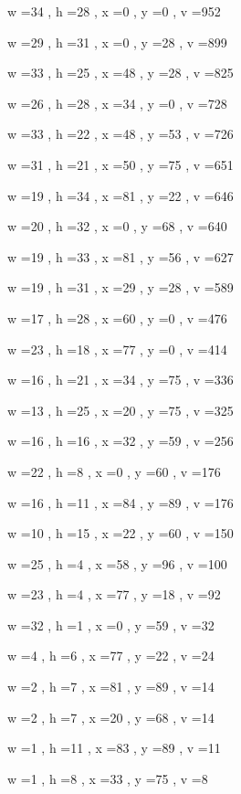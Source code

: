 \documentclass[11pt]{article}
\begin{document}
w =34 , h =28 , x =0 , y =0 , v =952
\par
w =29 , h =31 , x =0 , y =28 , v =899
\par
w =33 , h =25 , x =48 , y =28 , v =825
\par
w =26 , h =28 , x =34 , y =0 , v =728
\par
w =33 , h =22 , x =48 , y =53 , v =726
\par
w =31 , h =21 , x =50 , y =75 , v =651
\par
w =19 , h =34 , x =81 , y =22 , v =646
\par
w =20 , h =32 , x =0 , y =68 , v =640
\par
w =19 , h =33 , x =81 , y =56 , v =627
\par
w =19 , h =31 , x =29 , y =28 , v =589
\par
w =17 , h =28 , x =60 , y =0 , v =476
\par
w =23 , h =18 , x =77 , y =0 , v =414
\par
w =16 , h =21 , x =34 , y =75 , v =336
\par
w =13 , h =25 , x =20 , y =75 , v =325
\par
w =16 , h =16 , x =32 , y =59 , v =256
\par
w =22 , h =8 , x =0 , y =60 , v =176
\par
w =16 , h =11 , x =84 , y =89 , v =176
\par
w =10 , h =15 , x =22 , y =60 , v =150
\par
w =25 , h =4 , x =58 , y =96 , v =100
\par
w =23 , h =4 , x =77 , y =18 , v =92
\par
w =32 , h =1 , x =0 , y =59 , v =32
\par
w =4 , h =6 , x =77 , y =22 , v =24
\par
w =2 , h =7 , x =81 , y =89 , v =14
\par
w =2 , h =7 , x =20 , y =68 , v =14
\par
w =1 , h =11 , x =83 , y =89 , v =11
\par
w =1 , h =8 , x =33 , y =75 , v =8
\par
\newpage
\end{document}
